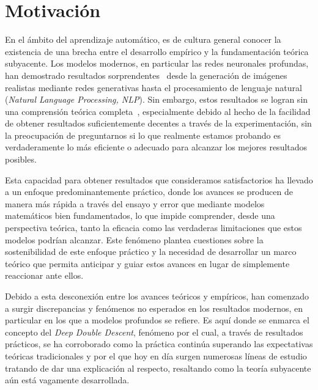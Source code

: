 \section{Motivación}

En el ámbito del aprendizaje automático, es de cultura general conocer la existencia de una brecha entre el desarrollo empírico y la fundamentación teórica subyacente. Los modelos modernos, en particular las redes neuronales profundas, han demostrado resultados sorprendentes~\cite{Sejnowski2020TheUE, He2020RecentAI} desde la generación de imágenes realistas mediante redes generativas hasta el procesamiento de lenguaje natural (\textit{Natural Language Processing, NLP}). Sin embargo, estos resultados se logran sin una comprensión teórica completa~\cite{Ben-David2009}, especialmente debido al hecho de la facilidad de obtener resultados suficientemente decentes a través de la experimentación, sin la preocupación de preguntarnos si lo que realmente estamos probando es verdaderamente lo más eficiente o adecuado para alcanzar los mejores resultados posibles.\newline

Esta capacidad para obtener resultados que consideramos satisfactorios ha llevado a un enfoque predominantemente práctico, donde los avances se producen de manera más rápida a través del ensayo y error que mediante modelos matemáticos bien fundamentados, lo que impide comprender, desde una perspectiva teórica, tanto la eficacia como las verdaderas limitaciones que estos modelos podrían alcanzar. Este fenómeno plantea cuestiones sobre la sostenibilidad de este enfoque práctico y la necesidad de desarrollar un marco teórico que permita anticipar y guiar estos avances en lugar de simplemente reaccionar ante ellos.\newline

Debido a esta desconexión entre los avances teóricos y empíricos, han comenzado a surgir discrepancias y fenómenos no esperados en los resultados modernos, en particular en los que a modelos profundos se refiere. Es aquí donde se enmarca el concepto del \emph{Deep Double Descent}, fenómeno por el cual, a través de resultados prácticos, se ha corroborado como la práctica continúa superando las expectativas teóricas tradicionales y por el que hoy en día surgen numerosas líneas de estudio tratando de dar una explicación al respecto, resaltando como la teoría subyacente aún está vagamente desarrollada.\newline

